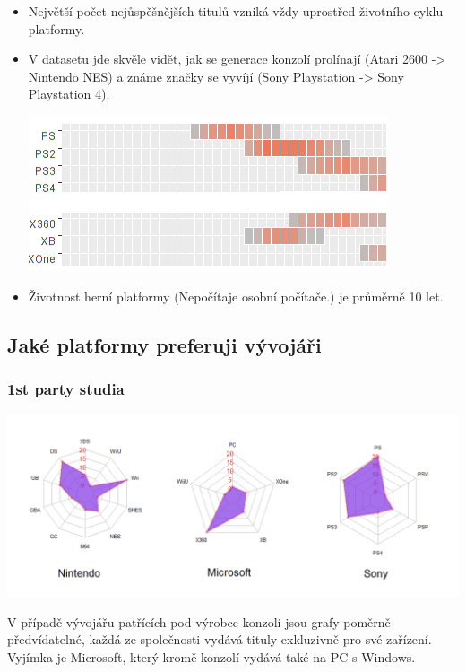 \documentclass[a4paper,11pt]{article}
\begin{document}
\begin{itemize}
\item Největší počet nejůspěšnějších titulů vzniká vždy uprostřed životního cyklu platformy.

\item V datasetu jde skvěle vidět, jak se generace konzolí prolínají (Atari 2600 -> Nintendo NES) a známe značky se vyvíjí (Sony Playstation -> Sony Playstation 4).

\begin{center}
\includegraphics[scale=2.0]{lifecycle}
\end{center}

\item Životnost herní platformy (Nepočítaje osobní počítače.) je průměrně 10 let.

\end{itemize}


\newpage

\subsection{Jaké platformy preferuji vývojáři}

\subsubsection{1st party studia}
\includegraphics[scale=0.5]{1stparty}

V případě vývojářu patřících pod výrobce konzolí jsou grafy poměrně předvídatelné, každá ze společnosti vydává tituly exkluzivně pro své zařízení. Vyjímka je Microsoft, který kromě konzolí vydává také na PC s Windows.
\end{document}
